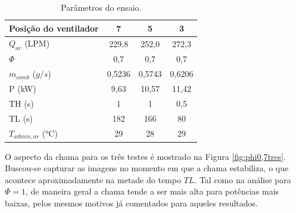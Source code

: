 \begin{table}[!ht]
	\centering
	\small
	\renewcommand{\arraystretch}{1.3}
	\caption{Parâmetros do ensaio.}%
	\label{tab:phi0,7}
        \begin{tabular}{|l|c|c|c|}
        \hline
        \textbf{Posição do ventilador} & \textbf{7} & \textbf{5} & \textbf{3} \\ \hline
        ${Q}_{ar}$ (LPM)           & 229,8      & 252,0      & 272,3      \\ \hline
        $\Phi$                         & 0,7        & 0,7        & 0,7        \\ \hline
        $\dot{m}_{comb}$ ($g/s$)       & 0,5236     & 0,5743     & 0,6206     \\ \hline
        P (kW)                         & 9,63       & 10,57      & 11,42      \\ \hline
        TH (s)                         & 1          & 1          & 0,5          \\ \hline
        TL (s)                         & 182        & 166           & 80          \\ \hline
        $T_{admin, ar}$ (°C)           & 29         & 28         & 29         \\ \hline
        \end{tabular}
    \vspace{2mm}
\end{table}

O aspecto da chama para os três testes é mostrado na Figura \ref{fig:phi0,7tres}. Buscou-se capturar as imagens no momento em que a chama estabiliza, o que acontece aproximadamente na metade do tempo $TL$. Tal como na análise para $\Phi = 1$, de maneira geral a chama tende a ser mais alta para potências mais baixas, pelos mesmos motivos já comentados para aqueles resultados. 

